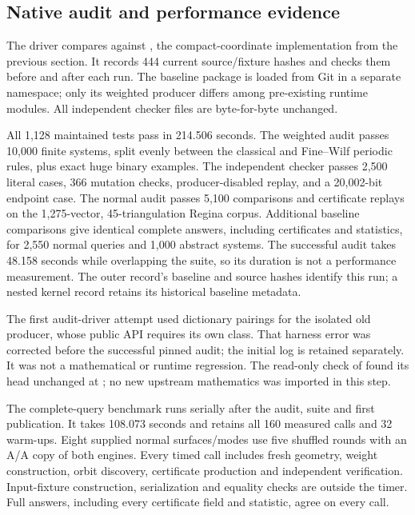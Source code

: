 \subsection{Native audit and performance evidence}

The driver  compares against
, the compact-coordinate implementation from the previous
section. It records 444 current source/fixture hashes and checks them before
and after each run. The baseline package is loaded from Git in a separate
namespace; only its weighted producer differs among pre-existing runtime
modules. All independent checker files are byte-for-byte unchanged.

All 1,128 maintained tests pass in 214.506 seconds. The weighted audit passes
10,000 finite systems, split evenly between the classical and Fine--Wilf
periodic rules, plus exact huge binary examples. The independent checker
passes 2,500 literal cases, 366 mutation checks, producer-disabled replay,
and a 20,002-bit endpoint case. The normal audit passes 5,100 comparisons
and certificate replays on the 1,275-vector, 45-triangulation Regina corpus.
Additional baseline comparisons give identical complete answers, including
certificates and statistics, for 2,550 normal queries and 1,000 abstract
systems. The successful audit takes 48.158 seconds while overlapping the
suite, so its duration is not a performance measurement. The outer record's
baseline and source hashes identify this run; a nested kernel record retains
its historical baseline metadata.

The first audit-driver attempt used dictionary pairings for the isolated old
producer, whose public API requires its own  class.
That harness error was corrected before the successful pinned audit; the
initial log is retained separately. It was not a mathematical or runtime
regression. The read-only check of  found its head unchanged
at ; no new upstream mathematics was imported in this step.

The complete-query benchmark runs serially after the audit, suite and first
publication. It takes 108.073 seconds and retains all 160 measured calls and
32 warm-ups. Eight supplied normal surfaces/modes use five shuffled rounds
with an A/A copy of both engines. Every timed call includes fresh geometry,
weight construction, orbit discovery, certificate production and independent
verification. Input-fixture construction, serialization and equality checks
are outside the timer. Full answers, including every certificate field and
statistic, agree on every call.

